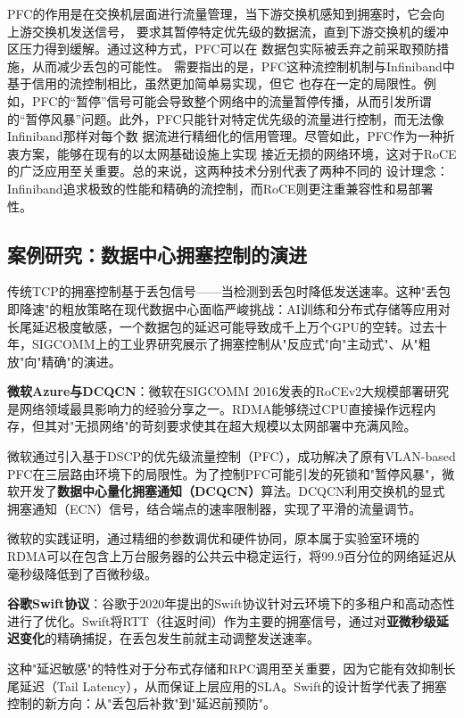 PFC的作用是在交换机层面进行流量管理，当下游交换机感知到拥塞时，它会向上游交换机发送信号，
要求其暂停特定优先级的数据流，直到下游交换机的缓冲区压力得到缓解。通过这种方式，PFC可以在
数据包实际被丢弃之前采取预防措施，从而减少丢包的可能性。
需要指出的是，PFC这种流控制机制与Infiniband中基于信用的流控制相比，虽然更加简单易实现，但它
也存在一定的局限性。例如，PFC的“暂停”信号可能会导致整个网络中的流量暂停传播，从而引发所谓
的“暂停风暴”问题。此外，PFC只能针对特定优先级的流量进行控制，而无法像Infiniband那样对每个数
据流进行精细化的信用管理。尽管如此，PFC作为一种折衷方案，能够在现有的以太网基础设施上实现
接近无损的网络环境，这对于RoCE的广泛应用至关重要。总的来说，这两种技术分别代表了两种不同的
设计理念：Infiniband追求极致的性能和精确的流控制，而RoCE则更注重兼容性和易部署性。
\subsection{案例研究：数据中心拥塞控制的演进}

传统TCP的拥塞控制基于丢包信号——当检测到丢包时降低发送速率。这种"丢包即降速"的粗放策略在现代数据中心面临严峻挑战：AI训练和分布式存储等应用对长尾延迟极度敏感，一个数据包的延迟可能导致成千上万个GPU的空转。过去十年，SIGCOMM上的工业界研究展示了拥塞控制从"反应式"向"主动式"、从"粗放"向"精确"的演进。

\textbf{微软Azure与DCQCN}：微软在SIGCOMM 2016发表的RoCEv2大规模部署研究是网络领域最具影响力的经验分享之一。RDMA能够绕过CPU直接操作远程内存，但其对"无损网络"的苛刻要求使其在超大规模以太网部署中充满风险。

微软通过引入基于DSCP的优先级流量控制（PFC），成功解决了原有VLAN-based PFC在三层路由环境下的局限性。为了控制PFC可能引发的死锁和"暂停风暴"，微软开发了\textbf{数据中心量化拥塞通知（DCQCN）}算法。DCQCN利用交换机的显式拥塞通知（ECN）信号，结合端点的速率限制器，实现了平滑的流量调节。

微软的实践证明，通过精细的参数调优和硬件协同，原本属于实验室环境的RDMA可以在包含上万台服务器的公共云中稳定运行，将99.9百分位的网络延迟从毫秒级降低到了百微秒级。

\textbf{谷歌Swift协议}：谷歌于2020年提出的Swift协议针对云环境下的多租户和高动态性进行了优化。Swift将RTT（往返时间）作为主要的拥塞信号，通过对\textbf{亚微秒级延迟变化}的精确捕捉，在丢包发生前就主动调整发送速率。

这种"延迟敏感"的特性对于分布式存储和RPC调用至关重要，因为它能有效抑制长尾延迟（Tail Latency），从而保证上层应用的SLA。Swift的设计哲学代表了拥塞控制的新方向：从"丢包后补救"到"延迟前预防"。

